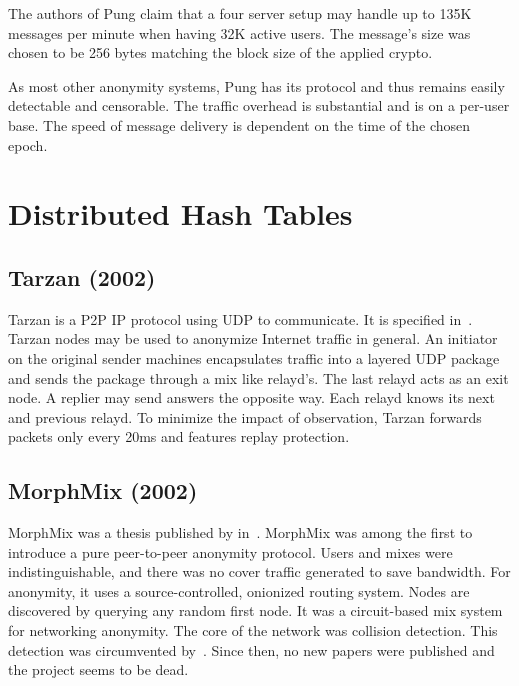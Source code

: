 The authors of Pung claim that a four server setup may handle up to 135K messages per minute when having 32K active users. The message's size was chosen to be 256 bytes matching the block size of the applied crypto. 

As most other anonymity systems, Pung has its protocol and thus remains easily detectable and censorable. The traffic overhead is substantial and is on a per-user base. The speed of message delivery is dependent on the time of the chosen epoch.

%

\section{Distributed Hash Tables}
\subsection{Tarzan (2002)}
Tarzan is a P2P IP protocol using UDP to communicate. It is specified in~\cite{tarzan:ccs02}. Tarzan nodes may be used to anonymize Internet traffic in general. An initiator on the original sender machines encapsulates traffic into a layered UDP package and sends the package through a mix like relayd's. The last relayd acts as an exit node. A replier may send answers the opposite way. Each relayd knows its next and previous relayd. To minimize the impact of observation, Tarzan forwards packets only every 20ms and features replay protection.

\subsection{MorphMix (2002)}
MorphMix was a thesis published by \citeauthor{morphmix:wpes2002} in~\cite{morphmix:wpes2002}. MorphMix was among the first to introduce a pure peer-to-peer anonymity protocol. Users and mixes were indistinguishable, and there was no cover traffic generated to save bandwidth. For anonymity, it uses a source-controlled, onionized routing system. Nodes are discovered by querying any random first node. It was a circuit-based mix system for networking anonymity. The core of the network was collision detection. This detection was circumvented by~\cite{morphmix:pet2006}. Since then, no new papers were published and the project seems to be dead.

